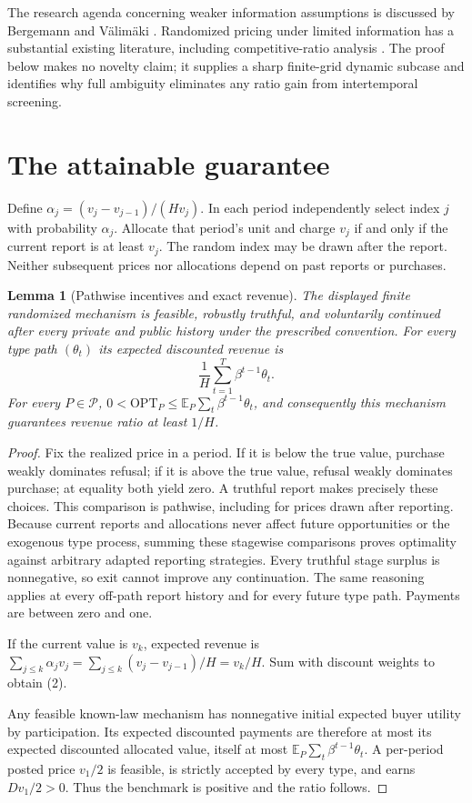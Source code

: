 \documentclass[11pt]{article}
\newtheorem{lemma}[theorem]{Lemma}
\theoremstyle{remark}\newtheorem{remark}[theorem]{Remark}
\newcommand{\E}{\mathbb E}
\begin{document}
The research agenda concerning weaker information assumptions is discussed by Bergemann and V\"alim\"aki \cite{BV}. Randomized pricing under limited information has a substantial existing literature, including competitive-ratio analysis \cite{EM}. The proof below makes no novelty claim; it supplies a sharp finite-grid dynamic subcase and identifies why full ambiguity eliminates any ratio gain from intertemporal screening.

\section*{The attainable guarantee}
Define $\alpha_j=(v_j-v_{j-1})/(Hv_j)$. In each period independently select index $j$ with probability $\alpha_j$. Allocate that period's unit and charge $v_j$ if and only if the current report is at least $v_j$. The random index may be drawn after the report. Neither subsequent prices nor allocations depend on past reports or purchases.

\begin{lemma}[Pathwise incentives and exact revenue]\label{lem:lower}
The displayed finite randomized mechanism is feasible, robustly truthful, and voluntarily continued after every private and public history under the prescribed convention. For every type path $(\theta_t)$ its expected discounted revenue is
\[
 \frac1H\sum_{t=1}^T\beta^{t-1}\theta_t.                         \tag{2}
\]
For every $P\in\mathcal P$, $0<\mathrm{OPT}_P\leq\E_P\sum_t\beta^{t-1}\theta_t$, and consequently this mechanism guarantees revenue ratio at least $1/H$.
\end{lemma}
\begin{proof}
Fix the realized price in a period. If it is below the true value, purchase weakly dominates refusal; if it is above the true value, refusal weakly dominates purchase; at equality both yield zero. A truthful report makes precisely these choices. This comparison is pathwise, including for prices drawn after reporting. Because current reports and allocations never affect future opportunities or the exogenous type process, summing these stagewise comparisons proves optimality against arbitrary adapted reporting strategies. Every truthful stage surplus is nonnegative, so exit cannot improve any continuation. The same reasoning applies at every off-path report history and for every future type path. Payments are between zero and one.

If the current value is $v_k$, expected revenue is
$\sum_{j\leq k}\alpha_jv_j=\sum_{j\leq k}(v_j-v_{j-1})/H=v_k/H$.
Sum with discount weights to obtain (2).

Any feasible known-law mechanism has nonnegative initial expected buyer utility by participation. Its expected discounted payments are therefore at most its expected discounted allocated value, itself at most $\E_P\sum_t\beta^{t-1}\theta_t$. A per-period posted price $v_1/2$ is feasible, is strictly accepted by every type, and earns $Dv_1/2>0$. Thus the benchmark is positive and the ratio follows.
\end{proof}
\end{document}

